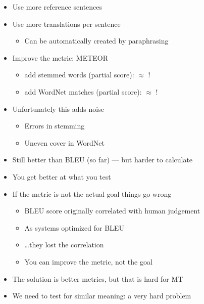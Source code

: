 \documentclass[a4paper,landscape,headrule,footrule,dvips]{foils}
\begin{document}
\begin{CJK}{UTF8}{min}

\begin{itemize}
\item Use more reference sentences
\item Use more translations per sentence
  \begin{itemize}
  \item Can be automatically created by paraphrasing
  \end{itemize}
\item Improve the metric: METEOR
  \begin{itemize}
  \item add stemmed words (partial score):  $\approx$ !
  \item add WordNet matches (partial score):  $\approx$ !
  \end{itemize}
\item Unfortunately this adds noise 
  \begin{itemize}
  \item Errors in stemming
  \item Uneven cover in WordNet
  \end{itemize}
\item Still better than BLEU (so far) --- but harder to calculate
\end{itemize}






\begin{itemize}
\item {\large You get better at what you test}
\item If the metric is not the actual goal things go wrong
  \begin{itemize}
  \item  BLEU score originally correlated with human judgement
  \item As systems optimized for BLEU
  \item \ldots they lost the correlation
  \item You can  improve the metric, not the goal
  \end{itemize}
\item The solution is better metrics, but that is hard for MT
\item We need to test for similar meaning: a very hard problem
\end{itemize}



\end{CJK}
\end{document}
